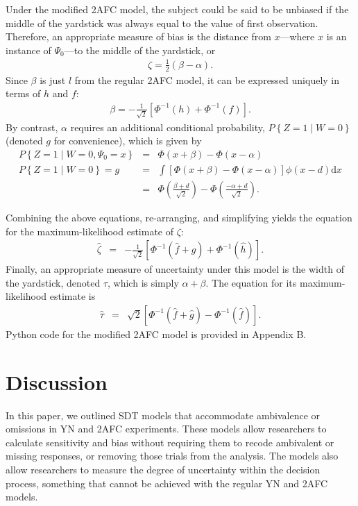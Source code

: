 \documentclass[man]{apa6}
\begin{document}
Under the modified 2AFC model, the subject could be said to be unbiased if the middle of the yardstick was always equal to the value of first observation. Therefore, an appropriate measure of bias is the distance from $x$---where $x$ is an instance of $\Psi_0$---to the middle of the yardstick, or
\begin{eqnarray*}
\zeta=\frac{1}{2}\left(\beta-\alpha\right)\textrm{.}
\end{eqnarray*}
Since $\beta$ is just $l$ from the regular 2AFC model, it can be expressed uniquely in terms of $h$ and $f$:
\begin{eqnarray*}
\beta=-\frac{1}{\sqrt{2}}\left[\Phi^{-1}\left(h\right)+\Phi^{-1}\left(f\right)\right]\textrm{.}
\end{eqnarray*}
By contrast, $\alpha$ requires an additional conditional probability, $P\left\{Z=1\mid{}W=0\right\}$ (denoted $g$ for convenience), which is given by
\begin{eqnarray*}
P\left\{Z=1\mid{}W=0,\Psi_0=x\right\}&=&\Phi\left(x+\beta\right)-\Phi\left(x-\alpha\right)\\
P\left\{Z=1\mid{}W=0\right\}=g&=&\int\!\left[\Phi\left(x+\beta\right)-\Phi\left(x-\alpha\right)\right]\phi\left(x-d\right)\textrm{d}x\\
&=&\Phi\left(\frac{\beta+d}{\sqrt{2}}\right)-\Phi\left(\frac{-\alpha+d}{\sqrt{2}}\right)\textrm{.}
\end{eqnarray*}


Combining the above equations, re-arranging, and simplifying yields the equation for the maximum-likelihood estimate of $\zeta$:
\begin{eqnarray}
\hat{\zeta}&=&-\frac{1}{\sqrt{2}}\left[\Phi^{-1}\left(\hat{f}+\hat{g}\right)+\Phi^{-1}\left(\hat{h}\right)\right]\textrm{.}
\end{eqnarray}
Finally, an appropriate measure of uncertainty under this model is the width of the yardstick, denoted $\tau$, which is simply $\alpha+\beta$. The equation for its maximum-likelihood estimate is
\begin{eqnarray}
\hat{\tau}&=&\sqrt{2}\left[\Phi^{-1}\left(\hat{f}+\hat{g}\right)-\Phi^{-1}\left(\hat{f}\right)\right]\textrm{.}
\end{eqnarray}Python code for the modified 2AFC model is provided in Appendix B.

\section{Discussion}
In this paper, we outlined SDT models that accommodate ambivalence or omissions in YN and 2AFC experiments. These models allow researchers to calculate sensitivity and bias without requiring them to recode ambivalent or missing responses, or removing those trials from the analysis. The models also allow researchers to measure the degree of uncertainty within the decision process, something that cannot be achieved with the regular YN and 2AFC models.
\end{document}

